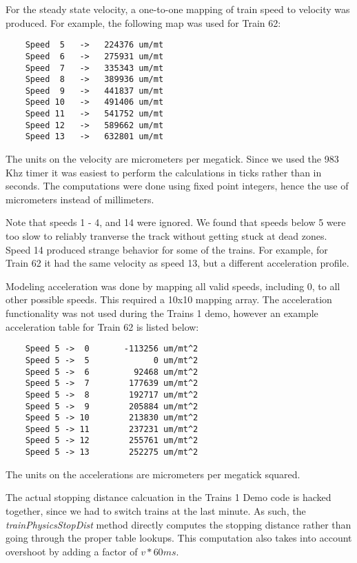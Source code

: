 \documentclass[twoside,a4paper]{refart}
\begin{document}
For the steady state velocity, a one-to-one mapping of train speed to velocity was produced. For example, the following map was used for Train 62:
\begin{verbatim}
    Speed  5   ->   224376 um/mt
    Speed  6   ->   275931 um/mt
    Speed  7   ->   335343 um/mt
    Speed  8   ->   389936 um/mt
    Speed  9   ->   441837 um/mt
    Speed 10   ->   491406 um/mt
    Speed 11   ->   541752 um/mt
    Speed 12   ->   589662 um/mt
    Speed 13   ->   632801 um/mt
\end{verbatim}

The units on the velocity are micrometers per megatick. Since we used the 983 Khz timer it was easiest to perform the calculations in ticks rather than in seconds. The computations were done using fixed point integers, hence the use of micrometers instead of millimeters.

Note that speeds 1 - 4, and 14 were ignored. We found that speeds below 5 were too slow to reliably tranverse the track without getting stuck at dead zones. Speed 14 produced strange behavior for some of the trains. For example, for Train 62 it had the same velocity as speed 13, but a different acceleration profile.

Modeling acceleration was done by mapping all valid speeds, including 0, to all other possible speeds. This required a 10x10 mapping array. The acceleration functionality was not used during the Trains 1 demo, however an example acceleration table for Train 62 is listed below:

\begin{verbatim}
    Speed 5 ->  0       -113256 um/mt^2
    Speed 5 ->  5             0 um/mt^2
    Speed 5 ->  6         92468 um/mt^2
    Speed 5 ->  7        177639 um/mt^2
    Speed 5 ->  8        192717 um/mt^2
    Speed 5 ->  9        205884 um/mt^2
    Speed 5 -> 10        213830 um/mt^2
    Speed 5 -> 11        237231 um/mt^2
    Speed 5 -> 12        255761 um/mt^2
    Speed 5 -> 13        252275 um/mt^2
\end{verbatim}

The units on the accelerations are micrometers per megatick squared.

The actual stopping distance calcuation in the Trains 1 Demo code is hacked together, since we had to switch trains at the last minute. As such, the \textit{trainPhysicsStopDist} method directly computes the stopping distance rather than going through the proper table lookups. This computation also takes into account overshoot by adding a factor of $v*60ms$.
\end{document}
